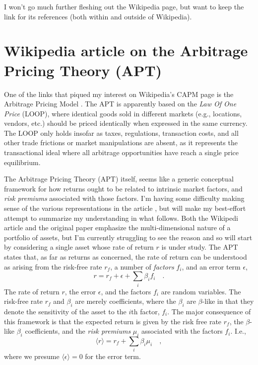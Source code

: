 \documentclass{article}
\begin{document}
I won't go much further fleshing out the Wikipedia page, but want to keep the link \cite{CAPM2026} for its references (both within and outside of Wikipedia).


\section{Wikipedia article on the Arbitrage Pricing Theory (APT)}

One of the links that piqued my interest on Wikipedia's CAPM page \cite{CAPM2026} is the Arbitrage Pricing Model \cite{APT2026}.  The APT is apparently based on the {\it Law Of One Price} (LOOP), where identical goods sold in different markets (e.g., locations, vendors, etc.) should be priced identically when expressed in the same currency.  The LOOP only holds insofar as taxes, regulations, transaction costs, and all other trade frictions or market manipulations are absent, as it represents the transactional ideal where all arbitrage opportunities have reach a single price equilibrium.

The Arbitrage Pricing Theory (APT) itself, seems like a generic conceptual framework for how returns ought to be related to intrinsic market factors, and {\it risk premiums} associated with those factors.  I'm having some difficulty making sense of the various representations in the article \cite{APT2026}, but will make my best-effort attempt to summarize my understanding in what follows.  Both the Wikipedi article and the original paper \cite{Ross1976} emphasize the multi-dimensional nature of a portfolio of assets, but I'm currently struggling to see the reason and so will start by considering a single asset whose rate of return $r$ is under study.  The APT states that, as far as returns as concerned, the rate of return can be understood as arising from the risk-free rate $r_f$, a number of {\it factors} $f_i$, and an error term $\epsilon$,
\begin{equation}
    r = r_f + \epsilon + \sum_i \beta_i f_i \quad.
\end{equation}
The rate of return $r$, the error $\epsilon$, and the factors $f_i$ are random variables.  The risk-free rate $r_f$ and $\beta_i$ are merely coefficients, where the $\beta_i$ are $\beta$-like in that they denote the sensitivity of the asset to the $i$th factor, $f_i$.  The major consequence of this framework is that the expected return is given by the risk free rate $r_f$, the $\beta$-like $\beta_i$ coefficients, and the {\it risk premiums} $\mu_i$ associated with the factors $f_i$.  I.e.,
\begin{equation}
    \langle r \rangle = r_f + \sum_i \beta_i \mu_i \quad ,
\end{equation}
where we presume $\langle \epsilon \rangle = 0$ for the error term.
\end{document}
